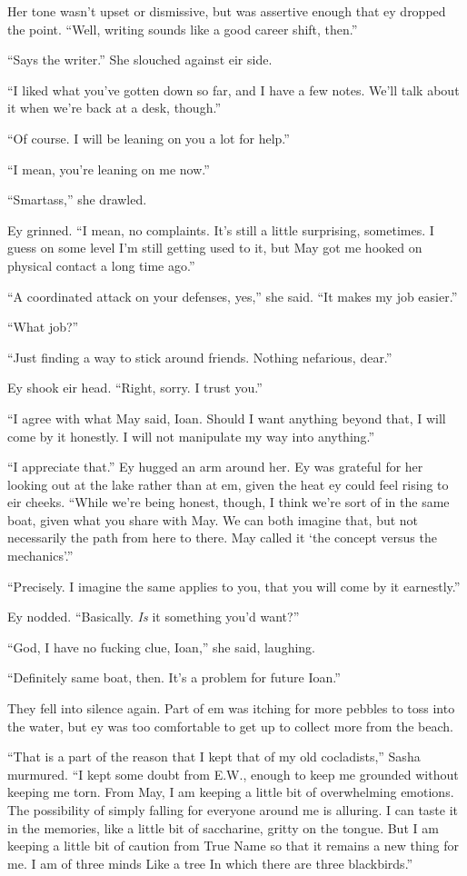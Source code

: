 Her tone wasn't upset or dismissive, but was assertive enough that ey dropped the point. ``Well, writing sounds like a good career shift, then.''

``Says the writer.'' She slouched against eir side.

``I liked what you've gotten down so far, and I have a few notes. We'll talk about it when we're back at a desk, though.''

``Of course. I will be leaning on you a lot for help.''

``I mean, you're leaning on me now.''

``Smartass,'' she drawled.

Ey grinned. ``I mean, no complaints. It's still a little surprising, sometimes. I guess on some level I'm still getting used to it, but May got me hooked on physical contact a long time ago.''

``A coordinated attack on your defenses, yes,'' she said. ``It makes my job easier.''

``What job?''

``Just finding a way to stick around friends. Nothing nefarious, dear.''

Ey shook eir head. ``Right, sorry. I trust you.''

``I agree with what May said, Ioan. Should I want anything beyond that, I will come by it honestly. I will not manipulate my way into anything.''

``I appreciate that.'' Ey hugged an arm around her. Ey was grateful for her looking out at the lake rather than at em, given the heat ey could feel rising to eir cheeks. ``While we're being honest, though, I think we're sort of in the same boat, given what you share with May. We can both imagine that, but not necessarily the path from here to there. May called it `the concept versus the mechanics'.''

``Precisely. I imagine the same applies to you, that you will come by it earnestly.''

Ey nodded. ``Basically. \emph{Is} it something you'd want?''

``God, I have no fucking clue, Ioan,'' she said, laughing.

``Definitely same boat, then. It's a problem for future Ioan.''

They fell into silence again. Part of em was itching for more pebbles to toss into the water, but ey was too comfortable to get up to collect more from the beach.

``That is a part of the reason that I kept that of my old cocladists,'' Sasha murmured. ``I kept some doubt from E.W., enough to keep me grounded without keeping me torn. From May, I am keeping a little bit of overwhelming emotions. The possibility of simply falling for everyone around me is alluring. I can taste it in the memories, like a little bit of saccharine, gritty on the tongue. But I am keeping a little bit of caution from True Name so that it remains a new thing for me. I am of three minds Like a tree In which there are three blackbirds.''

